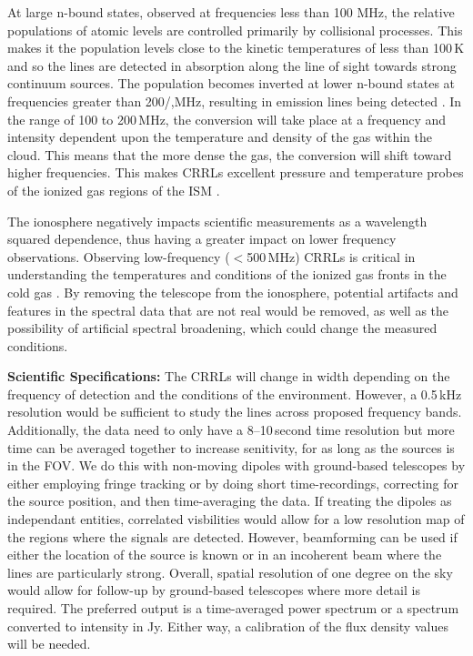 At large n-bound states, observed at frequencies less than 100 MHz, the relative populations of atomic levels are controlled primarily by collisional processes. This makes it the population levels close to the kinetic temperatures of less than 100\,K and so the lines are detected in absorption along the line of sight towards strong continuum sources. The population becomes inverted at lower n-bound states at frequencies greater than 200/,MHz, resulting in emission lines being detected \citep{Tremblay_2018}. In the range of 100 to 200\,MHz, the conversion will take place at a frequency and intensity dependent upon the temperature and density of the gas within the cloud. This means that the more dense the gas, the conversion will shift toward higher frequencies. This makes CRRLs excellent pressure and temperature probes of the ionized gas regions of the ISM \citep{Salas_2019}.

The ionosphere negatively impacts scientific measurements as a wavelength squared dependence, thus having a greater impact on lower frequency observations. Observing low-frequency ($<$500\,MHz) CRRLs is critical in understanding the temperatures and conditions of the ionized gas fronts in the cold gas \citep{Salas_2018}. By removing the telescope from the ionosphere, potential artifacts and features in the spectral data that are not real would be removed, as well as the possibility of artificial spectral broadening, which could change the measured conditions.

\textbf{Scientific Specifications:} The CRRLs will change in width depending on the frequency of detection and the conditions of the environment. However, a 0.5\,kHz resolution would be sufficient to study the lines across proposed frequency bands. Additionally, the data need to only have a 8--10\,second time resolution but more time can be averaged together to increase senitivity, for as long as the sources is in the FOV. We do this with non-moving dipoles with ground-based telescopes by either employing fringe tracking or by doing short time-recordings, correcting for the source position, and then time-averaging the data. If treating the dipoles as independant entities, correlated visbilities would allow for a low resolution map of the regions where the signals are detected. However, beamforming can be used if either the location of the source is known or in an incoherent beam where the lines are particularly strong. Overall, spatial resolution of one degree on the sky would allow for follow-up by ground-based telescopes where more detail is required. The preferred output is a time-averaged power spectrum or a spectrum converted to intensity in Jy. Either way, a calibration of the flux density values will be needed.

